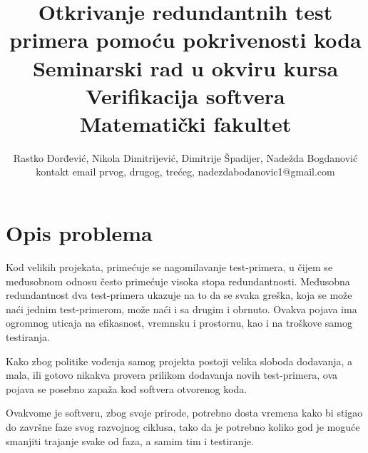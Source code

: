 \documentclass[a4paper]{article}
\begin{document}
\title{Otkrivanje redundantnih test primera pomoću pokrivenosti koda\\ \small{Seminarski rad u okviru kursa\\Verifikacija softvera\\ Matematički fakultet}}

\author{Rastko Đorđević, Nikola Dimitrijević, Dimitrije Špadijer, Nadežda Bogdanović\\ kontakt email prvog, drugog, trećeg, nadezdabodanovic1@gmail.com}


\maketitle


\tableofcontents

\newpage

\section{Opis problema}
\label{sec:opis_problema}

Kod velikih projekata, primećuje se nagomilavanje test-primera, u čijem se međusobnom odnosu često primećuje visoka stopa redundantnosti. Međusobna redundantnost dva test-primera ukazuje na to da se svaka greška, koja se može naći jednim test-primerom, može naći i sa drugim i obrnuto.
Ovakva pojava ima ogromnog uticaja na efikasnost, vremnsku i prostornu, kao i na troškove samog testiranja.

Kako zbog politike vođenja samog projekta postoji velika sloboda dodavanja, a mala, ili gotovo nikakva provera prilikom dodavanja novih test-primera, ova pojava se posebno zapaža kod softvera otvorenog koda.

Ovakvome je softveru, zbog svoje prirode, potrebno dosta vremena kako bi stigao do završne faze svog razvojnog ciklusa, tako da je potrebno koliko god je moguće smanjiti trajanje svake od faza, a samim tim i testiranje.
\end{document}
